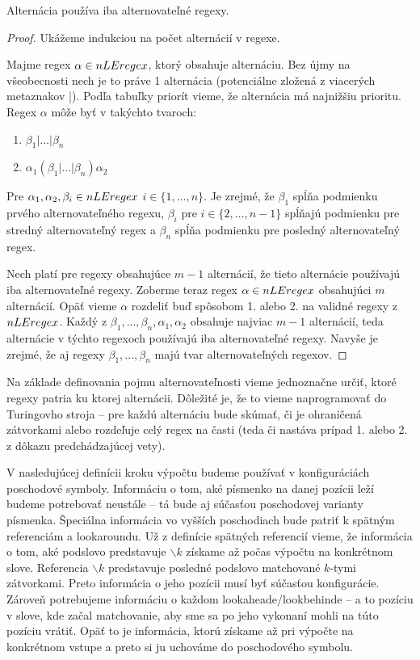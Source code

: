 \begin{lema}
Alternácia používa iba alternovateľné regexy.
\end{lema}
\begin{proof}
Ukážeme indukciou na počet alternácií v regexe.

Majme regex $\alpha \in nLEregex$, ktorý obsahuje alternáciu. Bez újmy na všeobecnosti nech je to práve 1 alternácia (potenciálne zložená z viacerých metaznakov |). Podľa tabuľky priorít vieme, že alternácia má najnižšiu prioritu. Regex $\alpha$ môže byť v takýchto tvaroch:
\begin{enumerate}
\item $\beta_1|\dots|\beta_n$
\item $\alpha_1(\beta_1|\dots|\beta_n)\alpha_2$
\end{enumerate}
Pre $\alpha_1,\alpha_2,\beta_i\in nLEregex$ $i\in\lbrace 1,\dots,n\rbrace$. Je zrejmé, že $\beta_1$ spĺňa podmienku prvého alternovateľného regexu, $\beta_i$ pre $i\in\lbrace 2,\dots,n-1\rbrace$ spĺňajú podmienku pre stredný alternovateľný regex a $\beta_n$ spĺňa podmienku pre posledný alternovateľný regex.

Nech platí pre regexy obsahujúce $m-1$ alternácií, že tieto alternácie používajú iba alternovateľné regexy. Zoberme teraz regex $\alpha \in nLEregex$ obsahujúci $m$ alternácií. Opäť vieme $\alpha$ rozdeliť buď spôsobom 1. alebo 2. na validné regexy z $nLEregex$. Každý z $\beta_1,\dots,\beta_n,\alpha_1,\alpha_2$ obsahuje najviac $m-1$ alternácií, teda alternácie v týchto regexoch používajú iba alternovateľné regexy. Navyše je zrejmé, že aj regexy $\beta_1,\dots,\beta_n$ majú tvar alternovateľných regexov.
\end{proof}

Na základe definovania pojmu alternovateľnosti vieme jednoznačne určiť, ktoré regexy patria ku ktorej alternácii. Dôležité je, že to vieme naprogramovať do Turingovho stroja -- pre každú alternáciu bude skúmať, či je ohraničená zátvorkami alebo rozdeľuje celý regex na časti (teda či nastáva prípad 1. alebo 2. z dôkazu predchádzajúcej vety).

V nasledujúcej definícii kroku výpočtu budeme používať v konfiguráciách poschodové symboly. Informáciu o tom, aké písmenko na danej pozícii leží budeme potrebovať neustále -- tá bude aj súčasťou poschodovej varianty písmenka. Špeciálna informácia vo vyšších poschodiach bude patriť k spätným referenciám a lookaroundu. Už z definície spätných referencií vieme, že informácia o tom, aké podslovo predstavuje $\backslash k$ získame až počas výpočtu na konkrétnom slove. Referencia $\backslash k$ predstavuje posledné podslovo matchované $k$-tymi zátvorkami. Preto informácia o jeho pozícii musí byť súčasťou konfigurácie. Zároveň potrebujeme informáciu o každom lookaheade/lookbehinde -- a to pozíciu v slove, kde začal matchovanie, aby sme sa po jeho vykonaní mohli na túto pozíciu vrátiť. Opäť to je informácia, ktorú získame až pri výpočte na konkrétnom vstupe a preto si ju uchováme do poschodového symbolu.

